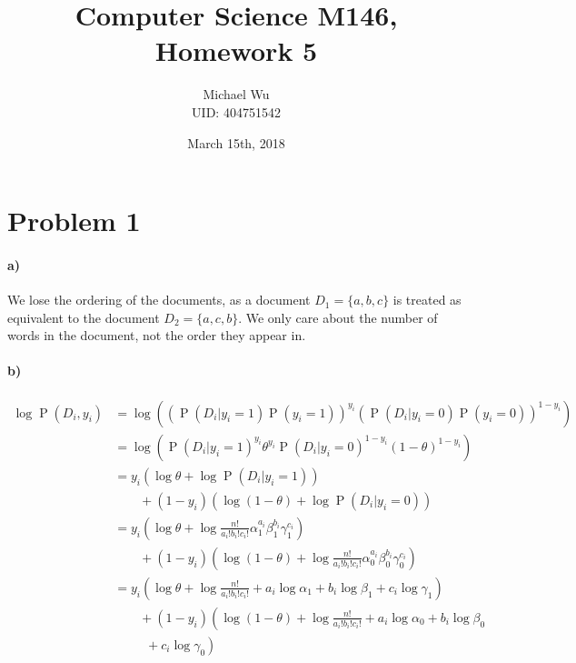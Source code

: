 \documentclass[12pt]{article}
\begin{document}
\title{Computer Science M146, Homework 5}
\date{March 15th, 2018}
\author{Michael Wu\\UID: 404751542}
\maketitle

\section*{Problem 1}

\paragraph{a)}

We lose the ordering of the documents, as a document \(D_1=\{a,b,c\}\) is treated as equivalent to the document \(D_2=\{a,c,b\}\). We only
care about the number of words in the document, not the order they appear in.

\paragraph{b)}

\begin{align*}
        \log \operatorname{P}(D_i, y_i) &= \log\left(\left(\operatorname{P}(D_i|y_i=1)\operatorname{P}(y_i=1)\right)^{y_i}
                \left(\operatorname{P}(D_i|y_i=0)\operatorname{P}(y_i=0)\right)^{1-y_i}\right)\\
        &=\log \left(\operatorname{P}(D_i|y_i=1)^{y_i}\theta^{y_i}\operatorname{P}(D_i|y_i=0)^{1-y_i}(1-\theta)^{1-y_i}\right)\\
        &=y_i(\log \theta + \log \operatorname{P}(D_i|y_i=1))\\
        &\qquad+(1-y_i) (\log (1-\theta) + \log \operatorname{P}(D_i|y_i=0))\\
        &=y_i\left(\log \theta + \log \frac{n!}{a_i!b_i!c_i!}\alpha_1^{a_i}\beta_1^{b_i}\gamma_1^{c_i}\right)\\
        &\qquad+(1-y_i) \left(\log(1-\theta)+ \log \frac{n!}{a_i!b_i!c_i!}\alpha_0^{a_i}\beta_0^{b_i}\gamma_0^{c_i}\right)\\
        &=y_i\left(\log \theta + \log \frac{n!}{a_i!b_i!c_i!}+a_i\log\alpha_1+b_i\log\beta_1+c_i\log\gamma_1\right)\\
        &\qquad+(1-y_i) \left(\log(1-\theta)+ \log \frac{n!}{a_i!b_i!c_i!}+a_i\log\alpha_0+b_i\log\beta_0\right.\\
        &\qquad\left.\phantom{\frac{0}{0}}+c_i\log\gamma_0\right)
\end{align*}
\end{document}
